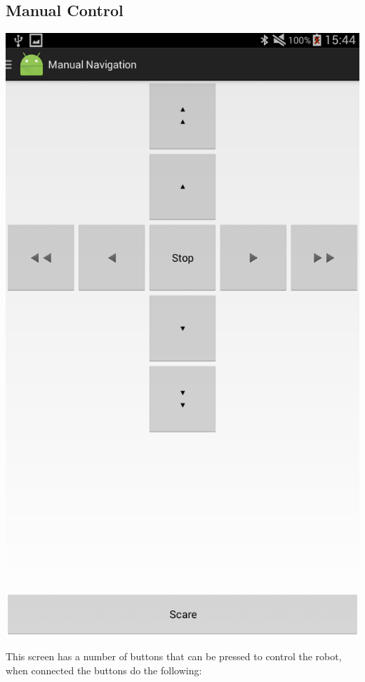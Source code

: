 \documentclass[]{article}   	%
\begin{document}
{\subsection{Manual Control}
\par{
\begin{center}
	\includegraphics[scale=0.3]{navpane.png}
\end{center}			
}
\par{This screen has a number of buttons that can be pressed to control the robot, when connected the buttons do the following: 
\begin{description}

\end{description}}}
\end{document}
